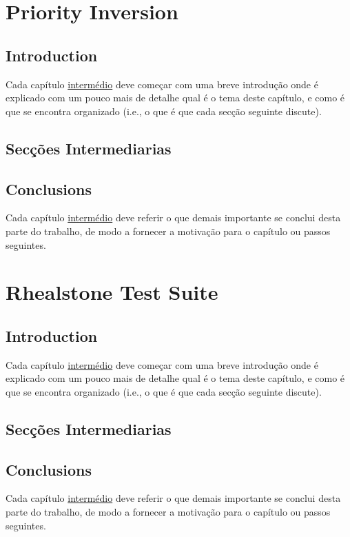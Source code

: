 \documentclass[titlepage,12pt,a4paper,times]{book}
\begin{document}
\chapter{Priority Inversion}
\label{chap:pi}

\section{Introduction}
\label{chap2:sec:intro}
Cada capítulo \underline{intermédio} deve começar com uma breve introdução onde
é explicado com um pouco mais de detalhe qual é o tema deste capítulo, e como é
que se encontra organizado (i.e., o que é que cada secção seguinte discute).

\section{Secções Intermediarias}
\label{chap2:sec:...}

\section{Conclusions}
\label{chap2:sec:concs}
Cada capítulo \underline{intermédio} deve referir o que demais importante se
conclui desta parte do trabalho, de modo a fornecer a motivação para o capítulo
ou passos seguintes.

\chapter{Rhealstone Test Suite}
\label{chap:rts}

\section{Introduction}
\label{chap2:sec:intro}
Cada capítulo \underline{intermédio} deve começar com uma breve introdução onde
é explicado com um pouco mais de detalhe qual é o tema deste capítulo, e como é
que se encontra organizado (i.e., o que é que cada secção seguinte discute).

\section{Secções Intermediarias}
\label{chap2:sec:...}

\section{Conclusions}
\label{chap2:sec:concs}
Cada capítulo \underline{intermédio} deve referir o que demais importante se
conclui desta parte do trabalho, de modo a fornecer a motivação para o capítulo
ou passos seguintes.
\end{document}
